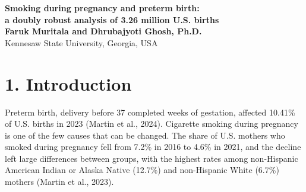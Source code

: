 \documentclass[11pt,letterpaper]{article}
\begin{document}
\begin{center}
{\LARGE\bfseries\sffamily\color{navy} Smoking during pregnancy and preterm birth:\\ a doubly robust analysis of 3.26 million U.S. births}\\[10pt]
{\bfseries Faruk Muritala and Dhrubajyoti Ghosh, Ph.D.}\\[2pt]
Kennesaw State University, Georgia, USA
\end{center}
\begin{abstract}
\noindent Smoking during pregnancy is a modifiable risk factor for preterm birth, but large U.S. analyses report adjusted odds ratios and do not show how much of the estimate rests on comparable mothers. The effect of smoking on preterm birth (under 37 weeks) was estimated on the absolute risk scale in \NTotal{} singleton live births from the 2023 U.S. Natality Public Use File (\NSmokers{} to mothers who smoked), with augmented inverse probability of treatment weighting (AIPTW) and ten confounders chosen from a causal diagram. The crude risk difference of \CrudeRD{} percentage points became \RDmain{} (95\% bootstrap CI \BootLo{} to \BootHi{}) after adjustment, a risk ratio of \RRmain{}. The effect among mothers who smoked was \ATT{} points (\ATTlo{} to \ATThi{}), about \ExcessPerK{} additional preterm births per 1,000 smoking pregnancies. The full-sample bootstrap standard error was \SEboot{}, against \SEif{} from the influence function. Estimates ranged from \RangeMin{} to \RangeMax{} across propensity score handling rules and covariate sets, and from \CFForest{} to \CFLasso{} with cross-fitted LASSO and random forest models. Overlap was limited (\LowNon{}\% of non-smokers had an estimated probability of smoking below 0.01) and the E-value was \EV{}. In an exploratory comparison, continuing to smoke instead of quitting added \ContQuit{} points. The results hold under the stated causal assumptions and self-reported smoking.

\smallskip\noindent\textbf{Keywords:} causal inference, doubly robust estimation, AIPTW, cross-fitting, overlap, preterm birth, maternal smoking, E-value
\end{abstract}

\section*{1. Introduction}

Preterm birth, delivery before 37 completed weeks of gestation, affected 10.41\% of U.S. births in 2023 (Martin et al., 2024). Cigarette smoking during pregnancy is one of the few causes that can be changed. The share of U.S. mothers who smoked during pregnancy fell from 7.2\% in 2016 to 4.6\% in 2021, and the decline left large differences between groups, with the highest rates among non-Hispanic American Indian or Alaska Native (12.7\%) and non-Hispanic White (6.7\%) mothers (Martin et al., 2023).
\end{document}
